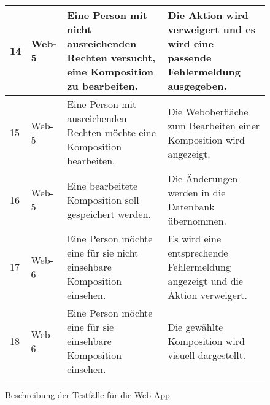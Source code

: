 \begin{figure}[!h]
\begin{center}
\begin{tabularx}{\textwidth}{ p{} | p{} | p{} | X }
			14 & Web-5 & Eine Person mit nicht ausreichenden Rechten versucht, eine Komposition zu bearbeiten. & Die Aktion wird verweigert und es wird eine passende Fehlermeldung ausgegeben. \\ \hline
			15 & Web-5 & Eine Person mit ausreichenden Rechten möchte eine Komposition bearbeiten. & Die Weboberfläche zum Bearbeiten einer Komposition wird angezeigt. \\ \hline
			16 & Web-5 & Eine bearbeitete Komposition soll gespeichert werden. & Die Änderungen werden in die Datenbank übernommen. \\ \hline
			17 & Web-6 & Eine Person möchte eine für sie nicht einsehbare Komposition einsehen. & Es wird eine entsprechende Fehlermeldung angezeigt und die Aktion verweigert. \\ \hline
			18 & Web-6 & Eine Person möchte eine für sie einsehbare Komposition einsehen. & Die gewählte Komposition wird visuell dargestellt.
			
		\end{tabularx}	
	\end{center}
	
	
	
	
	\caption{Beschreibung der Testfälle für die Web-App}
	\label{fig:testfaelle-webapp}
\end{figure}